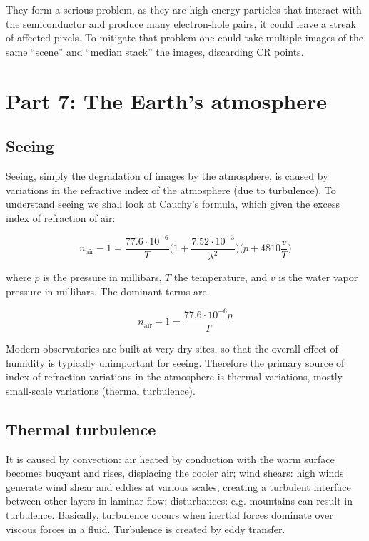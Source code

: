 \documentclass[a4paper]{article}
\begin{document}
They form a serious problem, as they are high-energy particles that interact with the semiconductor and produce many electron-hole pairs, it could leave a streak of affected pixels. To mitigate that problem one could take multiple images of the same ``scene'' and ``median stack'' the images, discarding CR points.

\section{Part 7: The Earth's atmosphere}

\subsection{Seeing}

Seeing, simply the degradation of images by the atmosphere, is caused by variations in the refractive index of the atmosphere (due to turbulence). To understand seeing we shall look at Cauchy's formula, which given the excess index of refraction of air:

\begin{equation*}
    n_{\text{air}}-1 = \frac{77.6\cdot 10^{-6}}{T}\bigg(1+\frac{7.52\cdot 10^{-3}}{\lambda^2}\bigg)\bigg(p+4810\frac{v}{T}\bigg)
\end{equation*}

where $p$ is the pressure in millibars, $T$ the temperature, and $v$ is the water vapor pressure in millibars. The dominant terms are

\begin{equation*}
    n_{\text{air}}-1 = \frac{77.6\cdot 10^{-6}p}{T}
\end{equation*}

Modern observatories are built at very dry sites, so that the overall effect of humidity is typically unimportant for seeing. Therefore the primary source of index of refraction variations in the atmosphere is thermal variations, mostly small-scale variations (thermal turbulence).

\subsection{Thermal turbulence}

It is caused by convection: air heated by conduction with the warm surface becomes buoyant and rises, displacing the cooler air; wind shears: high winds generate wind shear and eddies at various scales, creating a turbulent interface between other layers in laminar flow; disturbances: e.g. mountains can result in turbulence. Basically, turbulence occurs when inertial forces dominate over viscous forces in a fluid. Turbulence is created by eddy transfer.
\end{document}
